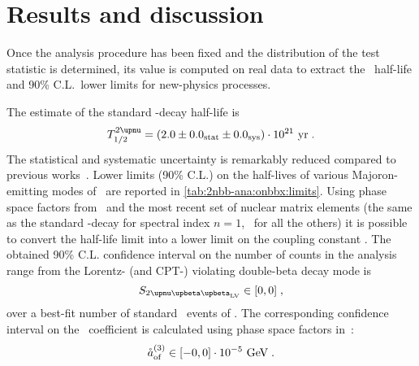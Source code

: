 \begin{table}
  \centering
  \caption{%
    Summary of the systematic uncertainties affecting the \nnbb\ distribution analysis.
  }\label{tab:2nbb-ana:systematics}
  
\end{table}

\section{Results and discussion}%
\label{sec:2nbb-ana:results}

Once the analysis procedure has been fixed and the distribution of the test statistic is
determined, its value is computed on real data to extract the \nnbb\ half-life and 90\%
C.L.~lower limits for new-physics processes.

The estimate of the standard \nnbb-decay half-life is
\[
  \thalftwoM = (2.0 \pm \stat{0.0} \pm \syst{0.0}) \cdot 10^{21}~\text{yr} \;.
\]
The statistical and systematic uncertainty is remarkably reduced compared to previous
works~\cite{Agostini2015a}.
\newpar
Lower limits (90\% C.L.) on the half-lives of various Majoron-emitting modes of \onbb\ are
reported in \cref{tab:2nbb-ana:onbbx:limits}. Using phase space factors
from~\cite{Kotila2015} and the most recent set of nuclear matrix elements (the same as the
standard \onbb-decay for spectral index $n=1$,~\cite{Hirsch1995} for all the others) it is
possible to convert the half-life limit into a lower limit on the coupling constant \ga.
\newpar
The obtained 90\% C.L. confidence interval on the number of counts in the analysis range
from the Lorentz- (and CPT-) violating double-beta decay mode is
\[
  S_\nnbblvM \in [0,0] \;,
\]
over a best-fit number of standard \nnbb\ events of . The corresponding
confidence interval on the \aof\ coefficient is calculated using phase space factors
in~\cite{Nitescu2020}:
\[
  {\mathring{a}_\text{of}^{(3)}} \in [-0, 0] \cdot 10^{-5}~\text{GeV} \;.
\]


\begin{table}
  \centering
  \caption{%
    90\% C.L.~lower limits for Majoron-emitting \onbb\ modes contributing to the \nnbb\
    event distribution. Nuclear matrix elements for $n=1$ are the same as the standard
    \onbb, and have been therefore selected from the most recent nuclear calculations.
    Matrix elements for the other decay modes have been taken from~\cite{Hirsch1995}.
    Phase space factors have been taken from~\cite{Kotila2015}. \fillme{numbers}
  }\label{tab:2nbb-ana:onbbx:limits}
  
\end{table}

